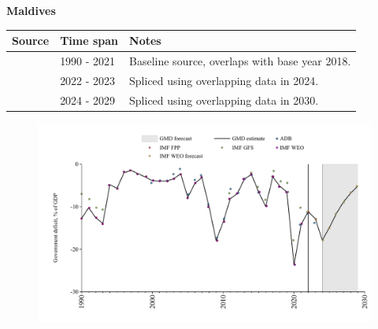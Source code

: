 \documentclass[12pt,a4paper,landscape]{article}
\begin{document}
\begin{adjustbox}{max totalsize={\paperwidth}{\paperheight},center}
\begin{minipage}[t][\textheight][t]{\textwidth}
\vspace*{0.5cm}
{}
\begin{center}
{\Large\bfseries Maldives}
\end{center}
\vspace{0.5cm}
\begin{table}[H]
\centering
\small
\begin{tabular}{|l|l|l|}
\hline
\textbf{Source} & \textbf{Time span} & \textbf{Notes} \\
\hline
\rowcolor{white}\cite{IMF_WEO}& 1990 - 2021 &Baseline source, overlaps with base year 2018.\\
\rowcolor{lightgray}\cite{IMF_FPP}& 2022 - 2023 &Spliced using overlapping data in 2024.\\
\rowcolor{white}\cite{IMF_WEO_forecast}& 2024 - 2029 &Spliced using overlapping data in 2030.\\
\hline
\end{tabular}
\end{table}
\begin{figure}[H]
\centering
\includegraphics[width=\textwidth,height=0.6\textheight,keepaspectratio]{graphs/MDV_govdef_GDP.pdf}
\end{figure}
\end{minipage}
\end{adjustbox}
\end{document}
